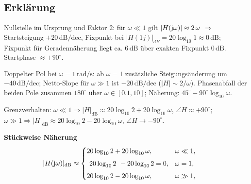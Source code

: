 \subsection{Erklärung}
\vspace{5mm}
\begin{description}[leftmargin=1.2em,labelsep=.6em,font=\bfseries]
\item[Schritt 1] Nullstelle im Ursprung und Faktor $2$: für $\omega\ll1$ gilt $|H(\operatorname{j}\!\omega)|\approx 2\,\omega$ $\Rightarrow$ Startsteigung $+20\,\mathrm{dB/dec}$, Fixpunkt bei $|H(1j)|_{dB}=20\log_{10}1\approx0\,\mathrm{dB}$; Fixpunkt für Geradennäherung liegt ca. $6\,\mathrm{dB}$ über exakten Fixpunkt $0\,\mathrm{dB}$. Startphase $\approx+90^\circ$.
\item[Schritt 2] Doppelter Pol bei $\omega=1\,\mathrm{rad/s}$: ab $\omega=1$ zusätzliche Steigungsänderung um $-40\,\mathrm{dB/dec}$; Netto-Slope für $\omega\gg1$ ist $-20\,\mathrm{dB/dec}$ ($|H|\sim 2/\omega$). Phasenabfall der beiden Pole zusammen $180^\circ$ über $\omega\in[0.1,10]$; Näherung: $45^\circ-90^\circ\log_{10}\omega$.
\item[Schritt 3] Grenzverhalten: $\omega\ll1\Rightarrow |H|_{\mathrm{dB}}\approx 20\log_{10}2+20\log_{10}\omega$, $\angle H\approx+90^\circ$; $\omega\gg1\Rightarrow |H|_{\mathrm{dB}}\approx 20\log_{10}2-20\log_{10}\omega$, $\angle H\to-90^\circ$.
\end{description}

\vspace{0.5cm}
\medskip
\noindent\textbf{Stückweise Näherung}
\[
|H(\operatorname{j}\!\omega)|_{\mathrm{dB}}\approx
\begin{cases}
20\log_{10}2+20\log_{10}\omega,& \omega\ll1,\\[4pt]
\left.\;20\log_{10}2\;\right.-20\log_{10}2=0,& \omega=1,\\[4pt]
20\log_{10}2-20\log_{10}\omega,& \omega\gg1,
\end{cases}
\qquad
\]
\newpage